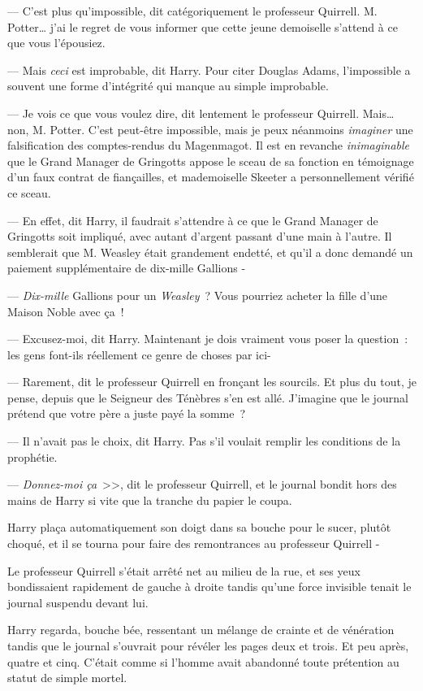 --- C'est plus qu'impossible, dit catégoriquement le professeur Quirrell. M. Potter… j'ai le regret de vous informer que cette jeune demoiselle s'attend à ce que vous l'épousiez.

--- Mais \emph{ceci} est improbable, dit Harry. Pour citer Douglas Adams, l'impossible a souvent une forme d'intégrité qui manque au simple improbable.

--- Je vois ce que vous voulez dire, dit lentement le professeur Quirrell. Mais… non, M. Potter. C'est peut-être impossible, mais je peux néanmoins \emph{imaginer} une falsification des comptes-rendus du Magenmagot. Il est en revanche \emph{inimaginable} que le Grand Manager de Gringotts appose le sceau de sa fonction en témoignage d'un faux contrat de fiançailles, et mademoiselle Skeeter a personnellement vérifié ce sceau.

--- En effet, dit Harry, il faudrait s'attendre à ce que le Grand Manager de Gringotts soit impliqué, avec autant d'argent passant d'une main à l'autre. Il semblerait que M. Weasley était grandement endetté, et qu'il a donc demandé un paiement supplémentaire de dix-mille Gallions -

--- \emph{Dix-mille} Gallions pour un \emph{Weasley}~? Vous pourriez acheter la fille d'une Maison Noble avec ça~!

--- Excusez-moi, dit Harry. Maintenant je dois vraiment vous poser la question~: les gens font-ils réellement ce genre de choses par ici-

--- Rarement, dit le professeur Quirrell en fronçant les sourcils. Et plus du tout, je pense, depuis que le Seigneur des Ténèbres s'en est allé. J'imagine que le journal prétend que votre père a juste payé la somme~?

--- Il n'avait pas le choix, dit Harry. Pas s'il voulait remplir les conditions de la prophétie.

--- \emph{Donnez-moi ça}~>>, dit le professeur Quirrell, et le journal bondit hors des mains de Harry si vite que la tranche du papier le coupa.

Harry plaça automatiquement son doigt dans sa bouche pour le sucer, plutôt choqué, et il se tourna pour faire des remontrances au professeur Quirrell -

Le professeur Quirrell s'était arrêté net au milieu de la rue, et ses yeux bondissaient rapidement de gauche à droite tandis qu'une force invisible tenait le journal suspendu devant lui.

Harry regarda, bouche bée, ressentant un mélange de crainte et de vénération tandis que le journal s'ouvrait pour révéler les pages deux et trois. Et peu après, quatre et cinq. C'était comme si l'homme avait abandonné toute prétention au statut de simple mortel.

